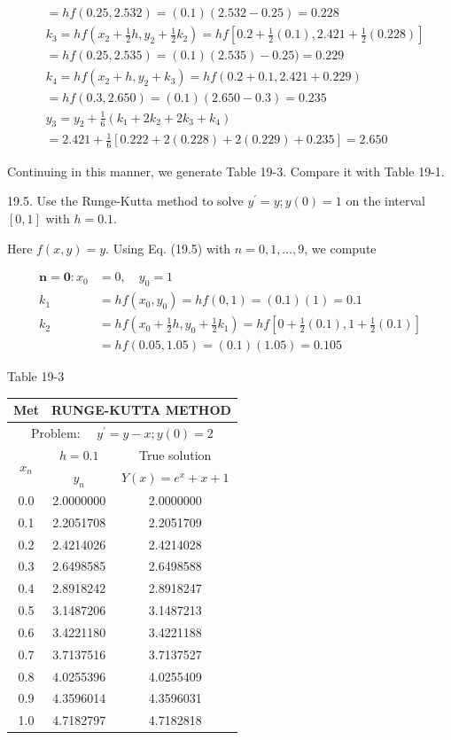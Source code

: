 \documentclass[10pt]{article}
\begin{document}
$$\begin{aligned}
& =h f(0.25,2.532)=(0.1)(2.532-0.25)=0.228 \\
& k_{3}=h f\left(x_{2}+\frac{1}{2} h, y_{2}+\frac{1}{2} k_{2}\right)=h f\left[0.2+\frac{1}{2}(0.1), 2.421+\frac{1}{2}(0.228)\right] \\
& =h f(0.25,2.535)=(0.1)(2.535)-0.25)=0.229 \\
& k_{4}=h f\left(x_{2}+h, y_{2}+k_{3}\right)=h f(0.2+0.1,2.421+0.229) \\
& =h f(0.3,2.650)=(0.1)(2.650-0.3)=0.235 \\
& y_{3}=y_{2}+\frac{1}{6}\left(k_{1}+2 k_{2}+2 k_{3}+k_{4}\right) \\
& =2.421+\frac{1}{6}[0.222+2(0.228)+2(0.229)+0.235]=2.650
\end{aligned}
$$

Continuing in this manner, we generate Table 19-3. Compare it with Table 19-1.

19.5. Use the Runge-Kutta method to solve $y^{\prime}=y ; y(0)=1$ on the interval $[0,1]$ with $h=0.1$.

Here $f(x, y)=y$. Using Eq. (19.5) with $n=0,1, \ldots, 9$, we compute

$$
\begin{aligned}
\boldsymbol{n}=\mathbf{0}: x_{0} & =0, \quad y_{0}=1 \\
k_{1} & =h f\left(x_{0}, y_{0}\right)=h f(0,1)=(0.1)(1)=0.1 \\
k_{2} & =h f\left(x_{0}+\frac{1}{2} h, y_{0}+\frac{1}{2} k_{1}\right)=h f\left[0+\frac{1}{2}(0.1), 1+\frac{1}{2}(0.1)\right] \\
& =h f(0.05,1.05)=(0.1)(1.05)=0.105
\end{aligned}
$$

Table 19-3

\begin{center}
\begin{tabular}{|c|c|c|}
\hline
Met & \multicolumn{2}{|c|}{RUNGE-KUTTA METHOD} \\
\hline
\multicolumn{3}{|c|}{Problem: $\quad y^{\prime}=y-x ; y(0)=2$} \\
\hline
\multirow[t]{2}{*}{$x_{n}$} & $h=0.1$ & True solution \\
\hline
 & $y_{n}$ & $Y(x)=e^{x}+x+1$ \\
\hline
0.0 & 2.0000000 & 2.0000000 \\
\hline
0.1 & 2.2051708 & 2.2051709 \\
\hline
0.2 & 2.4214026 & 2.4214028 \\
\hline
0.3 & 2.6498585 & 2.6498588 \\
\hline
0.4 & 2.8918242 & 2.8918247 \\
\hline
0.5 & 3.1487206 & 3.1487213 \\
\hline
0.6 & 3.4221180 & 3.4221188 \\
\hline
0.7 & 3.7137516 & 3.7137527 \\
\hline
0.8 & 4.0255396 & 4.0255409 \\
\hline
0.9 & 4.3596014 & 4.3596031 \\
\hline
1.0 & 4.7182797 & 4.7182818 \\
\hline
\end{tabular}
\end{center}
\end{document}
